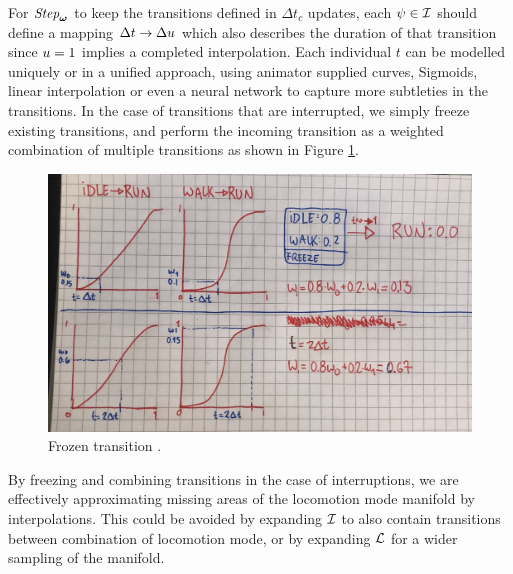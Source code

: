 For $\textit{Step}_{\boldsymbol{\omega }}$ to keep the transitions defined in $\Delta{t}_c$ updates, each $\psi\in\mathcal{I}$ should define a mapping $\Delta{t} \rightarrow \Delta u$ which also describes the duration of that transition since $u=1$ implies a completed interpolation. Each individual $t$ can be modelled uniquely or in a unified approach, using animator supplied curves, Sigmoids, linear interpolation or even a neural network to capture more subtleties in the transitions. In the case of transitions that are interrupted, we simply freeze existing transitions, and perform the incoming transition as a weighted combination of multiple transitions as shown in Figure \ref{fig:frozen-transition}. 
\begin{figure}
    \centering
    \includegraphics[width=0.75\columnwidth]{img/frozen-transitions}
    \caption{Frozen transition .}
  \label{fig:frozen-transition}
\end{figure}

By freezing and combining transitions in the case of interruptions, we are effectively approximating missing areas of the locomotion mode manifold by interpolations. This could be avoided by expanding $\mathcal{I}$ to also contain transitions between combination of locomotion mode, or by expanding $\mathcal{L}$ for a wider sampling of the manifold.

